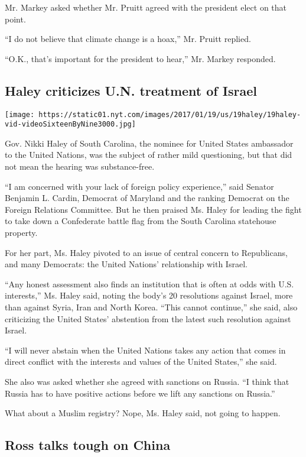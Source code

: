 Mr. Markey asked whether Mr. Pruitt agreed with the president elect on
that point.

``I do not believe that climate change is a hoax,'' Mr. Pruitt replied.

``O.K., that's important for the president to hear,'' Mr. Markey
responded.

\hypertarget{haley-criticizes-un-treatment-of-israel}{%
\subsection{Haley criticizes U.N. treatment of
Israel}\label{haley-criticizes-un-treatment-of-israel}}

\texttt{[image: https://static01.nyt.com/images/2017/01/19/us/19haley/19haley-vid-videoSixteenByNine3000.jpg]}

Gov. Nikki Haley of South Carolina, the nominee for United States
ambassador to the United Nations, was the subject of rather mild
questioning, but that did not mean the hearing was substance-free.

``I am concerned with your lack of foreign policy experience,'' said
Senator Benjamin L. Cardin, Democrat of Maryland and the ranking
Democrat on the Foreign Relations Committee. But he then praised Ms.
Haley for leading the fight to take down a Confederate battle flag from
the South Carolina statehouse property.

For her part, Ms. Haley pivoted to an issue of central concern to
Republicans, and many Democrats: the United Nations' relationship with
Israel.

``Any honest assessment also finds an institution that is often at odds
with U.S. interests,'' Ms. Haley said, noting the body's 20 resolutions
against Israel, more than against Syria, Iran and North Korea. ``This
cannot continue,'' she said, also criticizing the United States'
abstention from the latest such resolution against Israel.

``I will never abstain when the United Nations takes any action that
comes in direct conflict with the interests and values of the United
States,'' she said.

She also was asked whether she agreed with sanctions on Russia. ``I
think that Russia has to have positive actions before we lift any
sanctions on Russia.''

What about a Muslim registry? Nope, Ms. Haley said, not going to happen.

\hypertarget{ross-talks-tough-on-china}{%
\subsection{Ross talks tough on China}\label{ross-talks-tough-on-china}}

